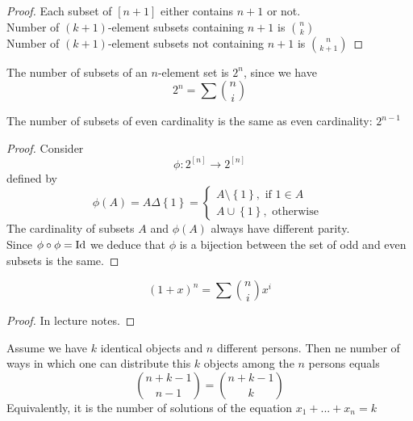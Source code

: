 \documentclass[../main.tex]{subfiles}
\begin{document}
\begin{proof}
	Each subset of $[n+1]$ either contains $n+1$ or not.\\
	Number of $( k+1) $-element subsets containing $n+1$ is  $\binom n k$ \\
	Number of $( k+1) $-element subsets not containing $n+1$ is $\binom n { k+1} $
\end{proof}
\begin{propo}
The number of subsets of an $n$-element  set is $2^{n}$, since we have
\[ 
2^{n} = \sum \binom n i
\]

\end{propo}
\begin{propo}
The number of subsets of even cardinality is the same as even cardinality: $2^{n-1}$
\end{propo}
\begin{proof}
Consider
\[ 
	\phi: 2^{[n]}\to 2^{[n]}
\]
defined by
\[ 
	\phi( A) = A \Delta \left\{ 1 \right\} = 
	\begin{cases}
	A \setminus \left\{ 1 \right\} , \text{ if } 1 \in A\\
	A \cup \left\{ 1 \right\} , \text{ otherwise } 
	\end{cases}
\]
The cardinality of subsets $A$ and $\phi( A)$ always have different parity.\\
Since $\phi \circ \phi = \operatorname*{Id} $ we deduce that $\phi$ is a bijection between the set of odd and even subsets is the same.

\end{proof}
\begin{thm}
\[ 
	( 1+x) ^{n} = \sum \binom n i x^{i}
\]

\end{thm}
\begin{proof}
In lecture notes.
\end{proof}
\begin{propo}
Assume we have $k$ identical objects and $n$ different persons. Then ne number of ways in which one can distribute this $k$ objects among the $n$ persons equals
\[ 
\binom { n + k-1} { n-1} = \binom { n+k-1} { k } 
\]
Equivalently, it is the number of solutions of the equation $ x_1 + ... + x_n = k$

\end{propo}
\end{document}
